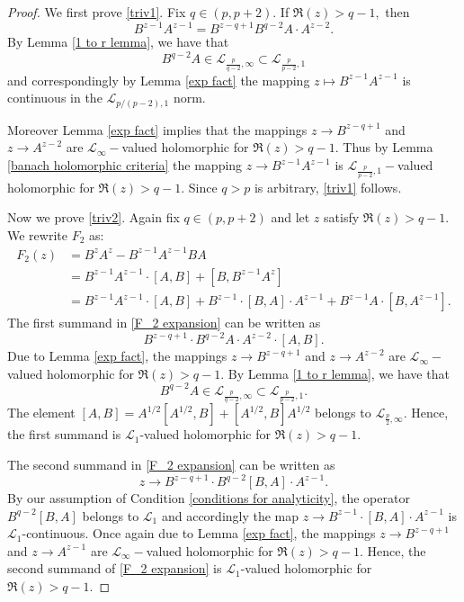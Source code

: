     \begin{proof}         
        We first prove \eqref{triv1}. Fix $q\in(p,p+2).$ If $\Re(z)>q-1,$ then
        $$B^{z-1}A^{z-1}=B^{z-q+1}B^{q-2}A\cdot A^{z-2}.$$
        By Lemma \ref{1 to r lemma}, we have that
        $$B^{q-2}A\in\mathcal{L}_{\frac{p}{q-2},\infty}\subset\mathcal{L}_{\frac{p}{p-2},1}$$
        and correspondingly by Lemma \ref{exp fact} the mapping $z\mapsto B^{z-1}A^{z-1}$ is continuous in the $\mathcal{L}_{p/(p-2),1}$ norm.
        
        Moreover Lemma \ref{exp fact} implies that the mappings $z\to B^{z-q+1}$ and $z\to A^{z-2}$ are $\mathcal{L}_{\infty}-$valued holomorphic for $\Re(z)>q-1.$ 
        Thus by Lemma \ref{banach holomorphic criteria} the mapping $z\to B^{z-1}A^{z-1}$ is $\mathcal{L}_{\frac{p}{p-2},1}-$valued holomorphic for $\Re(z)>q-1.$ 
        Since $q>p$ is arbitrary, \eqref{triv1} follows.

        Now we prove \eqref{triv2}. Again fix $q\in(p,p+2)$ and let $z$ satisfy $\Re(z)>q-1.$ We rewrite $F_2$ as:
        \begin{align}
            F_2(z) &= B^zA^z-B^{z-1}A^{z-1}BA\nonumber\\
                   &= B^{z-1}A^{z-1}\cdot [A,B]+[B,B^{z-1}A^z]\nonumber\\
                   &= B^{z-1}A^{z-1}\cdot[A,B]+B^{z-1}\cdot[B,A]\cdot A^{z-1}+B^{z-1}A\cdot[B,A^{z-1}].\label{F_2 expansion}
        \end{align}
        The first summand in \eqref{F_2 expansion} can be written as
        $$B^{z-q+1}\cdot B^{q-2}A\cdot A^{z-2}\cdot [A,B].$$
        Due to Lemma \ref{exp fact}, the mappings $z\to B^{z-q+1}$ and $z\to A^{z-2}$ are $\mathcal{L}_{\infty}-$valued holomorphic for $\Re(z)>q-1.$ By Lemma \ref{1 to r lemma}, we have that
        $$B^{q-2}A\in\mathcal{L}_{\frac{p}{q-2},\infty}\subset\mathcal{L}_{\frac{p}{p-2},1}.$$
        The element $[A,B] = A^{1/2}[A^{1/2},B]+[A^{1/2},B]A^{1/2}$ belongs to $\mathcal{L}_{\frac{p}{2},\infty}.$ Hence, the first summand is $\mathcal{L}_1$-valued holomorphic for $\Re(z)>q-1.$

        The second summand in \eqref{F_2 expansion} can be written as
        $$z\to B^{z-q+1}\cdot B^{q-2}[B,A]\cdot A^{z-1}.$$
        By our assumption of Condition \ref{conditions for analyticity}, the operator $B^{q-2}[B,A]$ belongs to $\mathcal{L}_1$ and accordingly the map $z\to B^{z-1}\cdot[B,A]\cdot A^{z-1}$ is $\mathcal{L}_1$-continuous. Once again due to Lemma \ref{exp fact}, the mappings $z\to B^{z-q+1}$ and $z\to A^{z-1}$ are $\mathcal{L}_{\infty}-$valued holomorphic for $\Re(z)>q-1.$ Hence, the second summand of \eqref{F_2 expansion} is $\mathcal{L}_1$-valued holomorphic for $\Re(z)>q-1.$


\end{proof}

